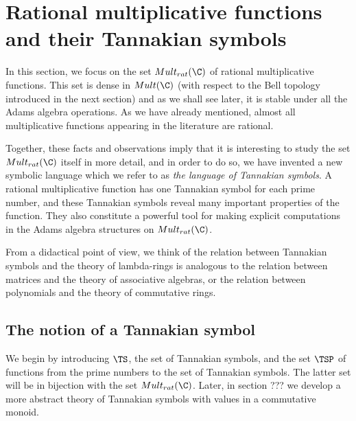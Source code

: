\documentclass[a4paper]{article}
\begin{document}
\section{Rational multiplicative functions and their Tannakian symbols} \label{sec:TannakianSymbols}

In this section, we focus on the set $Mult_{rat}(\C)$ of rational multiplicative functions. This set is dense in $Mult(\C)$ (with respect to the Bell topology introduced in the next section) and as we shall see later, it is stable under all the Adams algebra operations. As we have already mentioned, almost all multiplicative functions appearing in the literature are rational. 

Together, these facts and observations imply that it is interesting to study the set $Mult_{rat}(\C)$ itself in more detail, and in order to do so, we have invented a new symbolic language which we refer to as \emph{the language of Tannakian symbols}. A rational multiplicative function has one Tannakian symbol for each prime number, and these Tannakian symbols reveal many important properties of the function. They also constitute a powerful tool for making explicit computations in the Adams algebra structures on $Mult_{rat}(\C)$. 

From a didactical point of view, we think of the relation between Tannakian symbols and the theory of lambda-rings is analogous to the relation between matrices and the theory of associative algebras, or the relation between polynomials and the theory of commutative rings.




\subsection{The notion of a Tannakian symbol}

We begin by introducing $\TS$, the set of Tannakian symbols, and the set $\TSP$ of functions from the prime numbers to the set of Tannakian symbols. The latter set will be in bijection with the set $Mult_{rat}(\C)$. Later, in section ??? we develop a more abstract theory of Tannakian symbols with values in a commutative monoid. 
\end{document}
